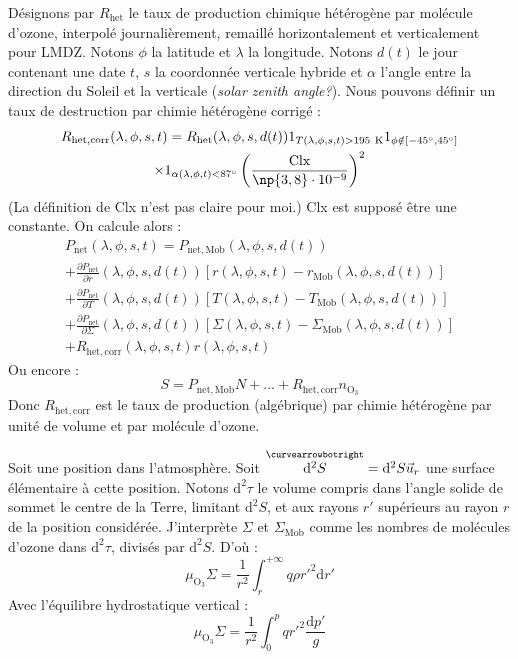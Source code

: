 \documentclass[a4paper,english,french]{article}
\newcommand{\ud}{\mathrm{d}}
\newcommand{\Eng}[1]{\textit{\foreignlanguage{english}{#1}}}
\newcommand{\pseudov}[1]{\overset{\curvearrowbotright}{#1}}
\begin{document}
Désignons par $R_\mathrm{het}$ le taux de production chimique
hétérogène par molécule d'ozone, interpolé journalièrement, remaillé
horizontalement et verticalement pour LMDZ. Notons $\phi$ la latitude
et $\lambda$ la longitude. Notons $d(t)$ le jour contenant une date
$t$, $s$ la coordonnée verticale hybride et $\alpha$ l'angle entre la
direction du Soleil et la verticale (\Eng{solar zenith angle?}). Nous
pouvons définir un taux de destruction par chimie hétérogène corrigé :
\begin{multline*}
  R_\mathrm{het,corr}(\lambda, \phi, s, t)
  =
  R_\mathrm{het}(\lambda, \phi, s, d(t))
  1_{T(\lambda, \phi, s, t) > 195\ \mathrm{K}}
  1_{\phi \notin [- 45^\circ, 45^\circ]} \\
  \times 1_{\alpha(\lambda, \phi, t) < 87^\circ}
  \left(\frac{\mathrm{Clx}}{\np{3,8} \cdot 10^{-9}}\right)^2
\end{multline*}
(La définition de Clx n'est pas claire pour moi.) Clx est supposé être
une constante. On calcule alors :
\begin{multline*}
  P_\mathrm{net}(\lambda, \phi, s, t)
  =
  P_\mathrm{net,Mob}(\lambda, \phi, s, d(t)) \\
  + \frac{\partial P_\mathrm{net}}{\partial r}(\lambda, \phi, s, d(t))
  [r(\lambda, \phi, s, t) - r_\mathrm{Mob}(\lambda, \phi, s, d(t))] \\
  + \frac{\partial P_\mathrm{net}}{\partial T}(\lambda, \phi, s, d(t))
  [T(\lambda, \phi, s, t) - T_\mathrm{Mob}(\lambda, \phi, s, d(t))] \\
  + \frac{\partial P_\mathrm{net}}{\partial \Sigma}
  (\lambda, \phi, s, d(t))
  [\Sigma(\lambda, \phi, s, t) - \Sigma_\mathrm{Mob}
  (\lambda, \phi, s, d(t))] \\
  + R_\mathrm{het,corr}(\lambda, \phi, s, t) r(\lambda, \phi, s, t)
\end{multline*}
Ou encore :
\begin{displaymath}
  S = P_\mathrm{net,Mob} N + \ldots
  + R_\mathrm{het,corr} n_{\mathrm{O}_3}
\end{displaymath}
Donc $R_\mathrm{het,corr}$ est le taux de production (algébrique) par
chimie hétérogène par unité de volume et par molécule d'ozone.

Soit une position dans l'atmosphère. Soit $\pseudov{\ud^2 S} = \ud^2 S
\vec u_r$ une surface élémentaire à cette position. Notons $\ud^2
\tau$ le volume compris dans l'angle solide de sommet le centre de la
Terre, limitant $\ud^2 S$, et aux rayons $r'$ supérieurs au rayon $r$
de la position considérée.  J'interprète $\Sigma$ et
$\Sigma_\mathrm{Mob}$ comme les nombres de molécules d'ozone dans
$\ud^2 \tau$, divisés par $\ud^2 S$. D'où :
\begin{displaymath}
  \mu_{\mathrm{O}_3} \Sigma
  = \frac{1}{r^2} \int_r ^{+ \infty} q \rho r'^2 \ud r'
\end{displaymath}
Avec l'équilibre hydrostatique vertical :
\begin{displaymath}
  \mu_{\mathrm{O}_3} \Sigma
  = \frac{1}{r^2} \int_0 ^p q r'^2 \frac{\ud p'}{g}
\end{displaymath}
\end{document}
